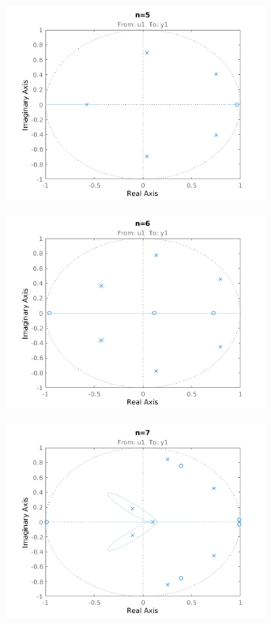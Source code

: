 \begin{figure}[h]
	\centering
	\begin{subfigure}{.49\textwidth}
		\includegraphics[height=6.5cm]{figures/zp5.pdf}
		\label{fig:zp5}
	\end{subfigure}\hfill
	\begin{subfigure}{.49\textwidth}
		\includegraphics[height=6.5cm]{figures/zp6.pdf}
		\label{fig:zp6}
	\end{subfigure}
	\begin{subfigure}{.49\textwidth}
		\includegraphics[height=6.5cm]{figures/zp7.pdf}

\end{subfigure}
\end{figure}
